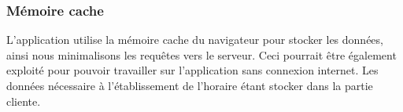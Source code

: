 \subsubsection{Mémoire cache}
L'application utilise la mémoire cache du navigateur pour stocker les données, ainsi nous minimalisons les requêtes vers le serveur. Ceci pourrait être également exploité pour pouvoir travailler sur l'application sans connexion internet. Les données nécessaire à l'établissement de l'horaire étant stocker dans la partie cliente.
